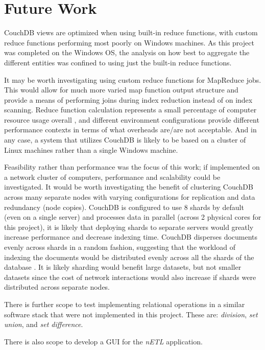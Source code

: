 \section{Future Work}
CouchDB views are optimized when using built-in reduce functions, with custom reduce functions performing most poorly on Windows machines. As this project was completed on the Windows OS, the analysis on how best to aggregate the different entities was confined to using just the built-in reduce functions.

It may be worth investigating using custom reduce functions for MapReduce jobs. This would allow for much more varied map function output structure and provide a means of performing joins during index reduction instead of on index scanning. Reduce function calculation represents a small percentage of computer resource usage overall \cite{slack1Nov}, and different environment configurations provide different performance contexts in terms of what overheads are/are not acceptable. And in any case, a system that utilizes CouchDB is likely to be based on a cluster of Linux machines rather than a single Windows machine.

Feasibility rather than performance was the focus of this work; if implemented on a network cluster of computers, performance and scalability could be investigated. It would be worth investigating the benefit of clustering CouchDB across many separate nodes with varying configurations for replication and data redundancy (node copies). CouchDB is configured to use 8 shards by default (even on a single server) and processes data in parallel (across 2 physical cores for this project), it is likely that deploying shards to separate servers would greatly increase performance and decrease indexing time. CouchDB disperses documents evenly across shards in a random fashion, suggesting that the workload of indexing the documents would be distributed evenly across all the shards of the database \cite{slack7Nov}. It is likely sharding would benefit large datasets, but not smaller datasets since the cost of network interactions would also increase if shards were distributed across separate nodes.

There is further scope to test implementing relational operations in a similar software stack that were not implemented in this project. These are: \textit{division}, \textit{set union}, and \textit{set difference}.

There is also scope to develop a GUI for the \textit{nETL} application.